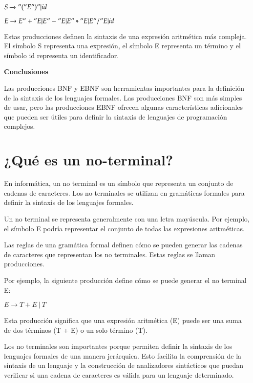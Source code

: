 \begin{center}
    $S \xrightarrow{} "(" E ")" | id$
    
    $E \xrightarrow{} E "+" E | E "-" E | E "*" E | E "/" E | id$
\end{center}

Estas producciones definen la sintaxis de una expresión aritmética más compleja. El símbolo S representa una expresión, el símbolo E representa un término y el símbolo id representa un identificador.

\textbf{Conclusiones}

Las producciones BNF y EBNF son herramientas importantes para la definición de la sintaxis de los lenguajes formales. Las producciones BNF son más simples de usar, pero las producciones EBNF ofrecen algunas características adicionales que pueden ser útiles para definir la sintaxis de lenguajes de programación complejos.





\section{¿Qué es un no\hyp{}terminal?}

En informática, un no terminal es un símbolo que representa un conjunto de cadenas de caracteres. Los no terminales se utilizan en gramáticas formales para definir la sintaxis de los lenguajes formales.

Un no terminal se representa generalmente con una letra mayúscula. Por ejemplo, el símbolo E podría representar el conjunto de todas las expresiones aritméticas.

Las reglas de una gramática formal definen cómo se pueden generar las cadenas de caracteres que representan los no terminales. Estas reglas se llaman producciones.

Por ejemplo, la siguiente producción define cómo se puede generar el no terminal E:

\begin{center}
    $E \xrightarrow{} T + E\: |\: T$
\end{center}

Esta producción significa que una expresión aritmética (E) puede ser una suma de dos términos (T + E) o un solo término (T).

Los no terminales son importantes porque permiten definir la sintaxis de los lenguajes formales de una manera jerárquica. Esto facilita la comprensión de la sintaxis de un lenguaje y la construcción de analizadores sintácticos que puedan verificar si una cadena de caracteres es válida para un lenguaje determinado.

